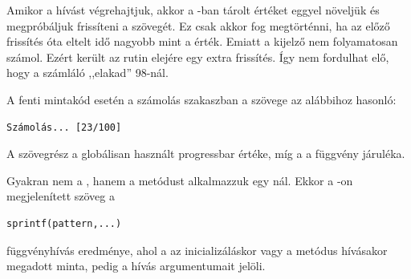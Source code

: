 Amikor a  hívást végrehajtjuk, akkor a
-ban tárolt értéket eggyel 
növeljük és megpróbáljuk frissíteni a  szövegét. Ez
csak akkor fog megtörténni, ha 
az előző frissítés óta eltelt idő nagyobb mint a 
érték. Emiatt a kijelző nem folyamatosan számol. Ezért került az
 rutin elejére egy extra frissítés. Így nem fordulhat elő, 
hogy a számláló ,,elakad'' 98-nál.

A fenti mintakód esetén a számolás szakaszban a 
szövege az alábbihoz hasonló: 
\begin{verbatim}
Számolás... [23/100]
\end{verbatim}
A  szövegrész a globálisan használt progressbar
értéke, míg a \code{ [23/100]} a 
 függvény járuléka.

Gyakran nem a , hanem a  metódust alkalmazzuk egy
nál. Ekkor a 
-on megjelenített szöveg a
\begin{verbatim}
sprintf(pattern,...)
\end{verbatim}
függvényhívás eredménye, ahol a  az inicializáláskor vagy a
 metódus hívásakor megadott minta,  pedig a
 hívás argumentumait jelöli. 

\endinput

